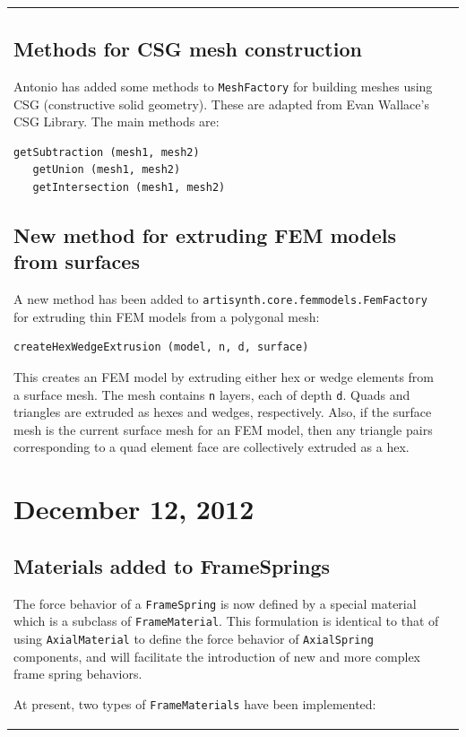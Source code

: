 \documentclass{article}
\begin{document}
\begin{tabular}{ll}
\subsection*{Methods for CSG mesh construction}

Antonio has added some methods to {\tt MeshFactory} for building
meshes using CSG (constructive solid geometry). These are adapted from
Evan Wallace's CSG Library. The main methods are:
\begin{lstlisting}[]
   getSubtraction (mesh1, mesh2)
   getUnion (mesh1, mesh2)
   getIntersection (mesh1, mesh2)
\end{lstlisting}

\subsection*{New method for extruding FEM models from surfaces}

A new method has been added to {\tt artisynth.core.femmodels.FemFactory}
for extruding thin FEM models from a polygonal mesh:
\begin{lstlisting}[]
   createHexWedgeExtrusion (model, n, d, surface)
\end{lstlisting}
This creates an FEM model by extruding either hex or wedge elements
from a surface mesh. The mesh contains {\tt n} layers, each of depth
{\tt d}. Quads and triangles are extruded as hexes and wedges,
respectively.  Also, if the surface mesh is the current surface mesh
for an FEM model, then any triangle pairs corresponding to a quad
element face are collectively extruded as a hex.

\section*{December 12, 2012}

\subsection*{Materials added to FrameSprings}

The force behavior of a {\tt FrameSpring} is now defined by a special
material which is a subclass of {\tt FrameMaterial}. This formulation
is identical to that of using {\tt AxialMaterial} to define the force
behavior of {\tt AxialSpring} components, and will facilitate the
introduction of new and more complex frame spring behaviors.

At present, two types of {\tt FrameMaterials} have been implemented:


\end{tabular}
\end{document}
